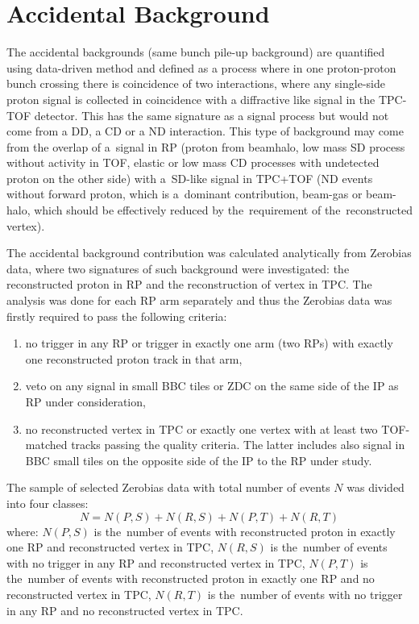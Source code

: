 \section{Accidental Background}\label{section:star_accidentals}
The accidental backgrounds (same bunch pile-up background) are quantified using data-driven method and defined as a process where in one proton-proton bunch crossing there is coincidence of two interactions, where any single-side proton signal is collected in coincidence with a diffractive like signal in the TPC-TOF detector. This has the same signature as a signal process but would not come from a DD, a CD or a ND interaction. This type of background may come from the overlap of a~signal in \ac{RP} (proton from beamhalo, low mass SD process without activity in TOF, elastic or low mass CD processes with undetected proton on the other side) with a~\ac{SD}-like signal in TPC+TOF (ND events without forward proton, which is a~dominant contribution, beam-gas or beam-halo, which  should be effectively reduced by the~requirement of the~reconstructed vertex).

The accidental background contribution was calculated analytically from Zerobias data, where two signatures of such background were investigated: the reconstructed proton in RP and the reconstruction of vertex in TPC. The analysis was done for each RP arm separately and thus the 
 Zerobias data was firstly required to pass the following criteria:
\begin{enumerate}
	\item no trigger in any RP or trigger in exactly one arm (two RPs) with exactly one reconstructed proton track in that arm,
	\item veto on any signal in small BBC tiles or ZDC on the same  side of the IP as  RP under consideration,
	\item no reconstructed vertex in TPC or exactly one vertex with at least two TOF-matched tracks passing the quality criteria. The latter includes also signal in BBC small tiles on the opposite side of the IP to the RP under study. 
\end{enumerate}
 The sample of selected Zerobias data with total  number  of events $N$ was divided into four classes:
\begin{equation}
N=N(P,S)+N(R,S)+N(P,T)+N(R,T)
\label{eq:accidentalSTAR_N}
\end{equation}
where: $N(P,S)$ is the~number of events with reconstructed proton in exactly one RP and reconstructed vertex in TPC, $N(R,S)$  is the~number of events with no trigger in any RP and reconstructed vertex in TPC, $N(P,T)$ is the~number of events with reconstructed proton in exactly one RP and no reconstructed vertex in TPC, $N(R,T)$ is the~number of events with no trigger in any RP and no reconstructed vertex in TPC.\\


